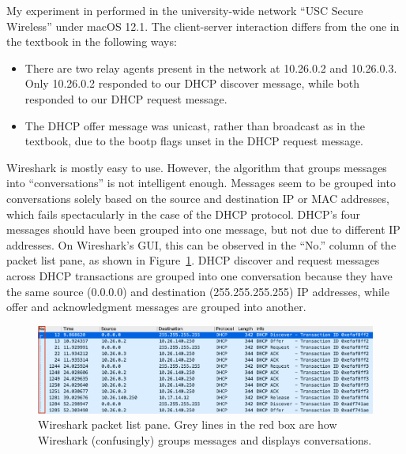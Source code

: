 \documentclass{article}
\begin{document}
My experiment in performed in the university-wide network ``USC Secure Wireless'' under macOS 12.1. The client-server interaction differs from the one in the textbook in the following ways:

\begin{itemize}
    \item There are two relay agents present in the network at 10.26.0.2 and 10.26.0.3. Only 10.26.0.2 responded to our DHCP discover message, while both responded to our DHCP request message.
    \item The DHCP offer message was unicast, rather than broadcast as in the textbook, due to the bootp flags unset in the DHCP request message.
\end{itemize}

Wireshark is mostly easy to use. However, the algorithm that groups messages into ``conversations'' is not intelligent enough. Messages seem to be grouped into conversations solely based on the source and destination IP or MAC addresses, which fails spectacularly in the case of the DHCP protocol. DHCP's four messages should have been grouped into one message, but not due to different IP addresses. On Wireshark's GUI, this can be observed in the ``No.'' column of the packet list pane, as shown in Figure~\ref{fig:wireshark-conversations}. DHCP discover and request messages across DHCP transactions are grouped into one conversation because they have the same source (0.0.0.0) and destination (255.255.255.255) IP addresses, while offer and acknowledgment messages are grouped into another.

\begin{figure}[tb]
    \includegraphics[width=\linewidth]{img/wireshark-conversations.png}
    \caption{Wireshark packet list pane. Grey lines in the red box are how Wireshark (confusingly) groups messages and displays conversations.}
    \label{fig:wireshark-conversations}
\end{figure}
\end{document}
